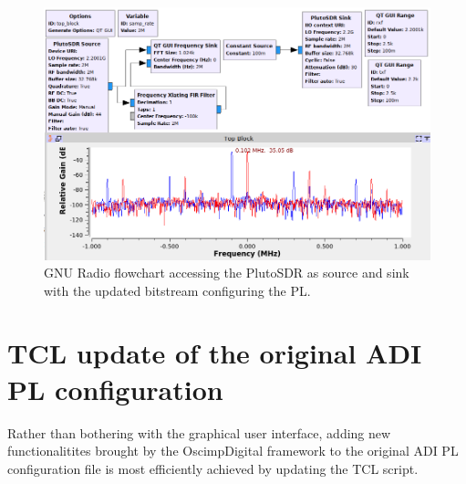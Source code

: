 \documentclass{article}
\begin{document}
\begin{figure}[h!tb]
\includegraphics[width=\linewidth]{gnuradio.png}
\caption{GNU Radio flowchart accessing the PlutoSDR as source and sink with the updated
bitstream configuring the PL.}
\label{gnuradio}
\end{figure}

\section{TCL update of the original ADI PL configuration}

Rather than bothering with the graphical user interface, adding new functionalitites
brought by the OscimpDigital framework to the original ADI PL configuration file is most
efficiently achieved by updating the TCL script.
\end{document}
